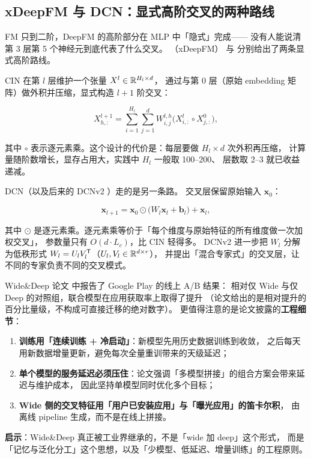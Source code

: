 \subsection{xDeepFM 与 DCN：显式高阶交叉的两种路线}

FM 只到二阶，DeepFM 的高阶部分在 MLP 中「隐式」完成——
没有人能说清第 3 层第 5 个神经元到底代表了什么交叉。
（xDeepFM）
与  分别给出了两条显式高阶路线。

CIN 在第 $l$ 层维护一个张量 $X^l \in \mathbb{R}^{H_l \times d}$，
通过与第 $0$ 层（原始 embedding 矩阵）做外积并压缩，显式构造 $l+1$ 阶交叉：

\begin{equation}
X^{l+1}_{h,:} = \sum_{i=1}^{H_l}\sum_{j=1}^{d}
W^{l,h}_{i,j} \big( X^{l}_{i,:} \circ X^{0}_{j,:} \big),
\label{eq:cin}
\end{equation}

其中 $\circ$ 表示逐元素乘。这个设计的代价是：每层要做 $H_l \times d$ 次外积再压缩，
计算量随阶数增长，显存占用大，实践中 $H_l$ 一般取 100--200、
层数取 2--3 就已收益递减。

DCN（以及后来的 DCNv2 \cite{wang2021dcn}）走的是另一条路。
交叉层保留原始输入 $\bm{x}_0$：

\begin{equation}
\bm{x}_{l+1} = \bm{x}_0 \odot \big( W_l \bm{x}_l + \bm{b}_l \big) + \bm{x}_l ,
\label{eq:dcn}
\end{equation}

其中 $\odot$ 是逐元素乘。逐元素乘等价于「每个维度与原始特征的所有维度做一次加权交叉」，
参数量只有 $O(d \cdot L_c)$，比 CIN 轻得多。
DCNv2 进一步把 $W_l$ 分解为低秩形式 $W_l = U_l V_l^{\mathsf{T}}$（$U_l, V_l \in \mathbb{R}^{d \times r}$），
并提出「混合专家式」的交叉层，让不同的专家负责不同的交叉模式。

\begin{casebox}
Wide\&Deep 论文 \cite{cheng2016widendeep} 中报告了 Google Play 的线上 A/B 结果：
相对仅 Wide 与仅 Deep 的对照组，联合模型在应用获取率上取得了提升
（论文给出的是相对提升的百分比量级，不构成可直接迁移的绝对数字）。
更值得注意的是论文披露的\textbf{工程细节}：
\begin{enumerate}
  \item \textbf{训练用「连续训练 + 冷启动」}：新模型先用历史数据训练到收敛，
        之后每天用新数据增量更新，避免每次全量重训带来的天级延迟；
  \item \textbf{单个模型的服务延迟必须压住}：论文强调「多模型拼接」的组合方案会带来延迟与维护成本，
        因此坚持单模型同时优化多个目标；
  \item \textbf{Wide 侧的交叉特征用「用户已安装应用」与「曝光应用」的笛卡尔积}，
        由离线 pipeline 生成，而不是在线上拼接。
\end{enumerate}
\textbf{启示}：Wide\&Deep 真正被工业界继承的，不是「wide 加 deep」这个形式，
而是「记忆与泛化分工」这个思想，以及「少模型、低延迟、增量训练」的工程原则。
\end{casebox}

